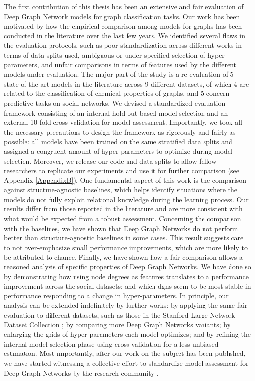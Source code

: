 The first contribution of this thesis has been an extensive and fair evaluation of Deep Graph Network models for graph classification tasks. Our work has been motivated by how the empirical comparison among models for graphs has been conducted in the literature over the last few years. We identified several flaws in the evaluation protocols, such as poor standardization across different works in terms of data splits used, ambiguous or under-specified selection of hyper-parameters, and unfair comparisons in terms of features used by the different models under evaluation. The major part of the study is a re-evaluation of 5 state-of-the-art models in the literature across 9 different datasets, of which 4 are related to the classification of chemical properties of graphs, and 5 concern predictive tasks on social networks. We devised a standardized evaluation framework consisting of an internal hold-out based model selection and an external 10-fold cross-validation for model assessment. Importantly, we took all the necessary precautions to design the framework as rigorously and fairly as possible: all models have been trained on the same stratified data splits and assigned a congruent amount of hyper-parameters to optimize during model selection. Moreover, we release our code and data splits to allow fellow researchers to replicate our experiments and use it for further comparison (see Appendix \ref{AppendixB}). One fundamental aspect of this work is the comparison against structure-agnostic baselines, which helps identify situations where the models do not fully exploit relational knowledge during the learning process. Our results differ from those reported in the literature and are more consistent with what would be expected from a robust assessment. Concerning the comparison with the baselines, we have shown that Deep Graph Networks do not perform better than structure-agnostic baselines in some cases. This result suggests care to not over-emphasize small performance improvements, which are more likely to be attributed to chance. Finally, we have shown how a fair comparison allows a reasoned analysis of specific properties of Deep Graph Networks. We have done so by demonstrating how using node degrees as features translates to a performance improvement across the social datasets; and which \glspl{dgn} seem to be most stable in performance responding to a change in hyper-parameters. In principle, our analysis can be extended indefinitely by further works: by applying the same fair evaluation to different datasets, such as those in the Stanford Large Network Dataset Collection \cite{leskovec2014snap}; by comparing more Deep Graph Networks variants; by enlarging the grids of hyper-parameters each model optimizes; and by refining the internal model selection phase using cross-validation for a less unbiased estimation. Most importantly, after our work on the subject has been published, we have started witnessing a collective effort to standardize model assessment for Deep Graph Networks by the research community \citep{hu2020ogb,morris2020tudatasets}.
\vspace{1em}

